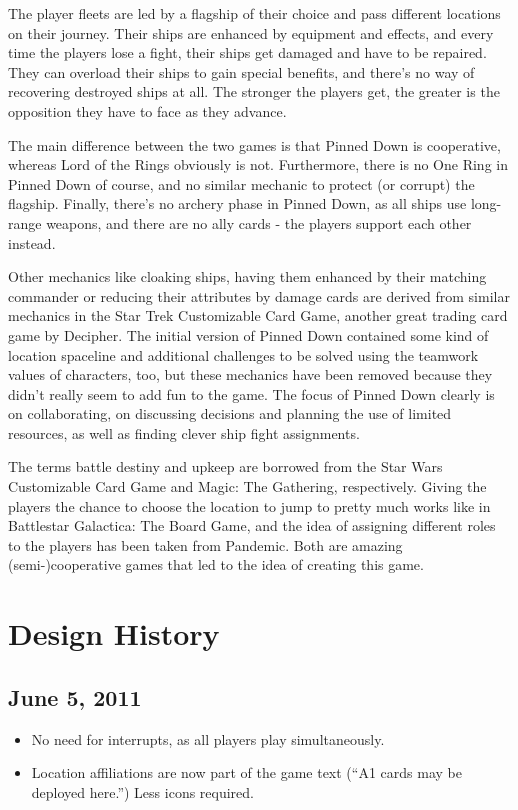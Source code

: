 \documentclass[11pt, a4paper]{article}
\begin{document}
The player fleets are led by a flagship of their choice and pass different
locations on their journey. Their ships are enhanced by equipment and effects,
and every time the players lose a fight, their ships get damaged and have to be
repaired. They can overload their ships to gain special benefits, and there's no
way of recovering destroyed ships at all. The stronger the players get, the
greater is the opposition they have to face as they advance.

The main difference between the two games is that Pinned Down is cooperative,
whereas Lord of the Rings obviously is not. Furthermore, there is no One Ring
in Pinned Down of course, and no similar mechanic to protect (or corrupt) the
flagship. Finally, there's no archery phase in Pinned Down, as all ships use
long-range weapons, and there are no ally cards - the players support each
other instead.

Other mechanics like cloaking ships, having them enhanced by their matching
commander or reducing their attributes by damage cards are derived from similar
mechanics in the Star Trek Customizable Card Game, another great trading card
game by Decipher. The initial version of Pinned Down contained some kind of
location spaceline and additional challenges to be solved using the teamwork
values of characters, too, but these mechanics have been removed because they
didn't really seem to add fun to the game. The focus of Pinned Down clearly is
on collaborating, on discussing decisions and planning the use of limited
resources, as well as finding clever ship fight assignments.

The terms battle destiny and upkeep are borrowed from the Star Wars Customizable
Card Game and Magic: The Gathering, respectively. Giving the players the chance
to choose the location to jump to pretty much works like in Battlestar
Galactica: The Board Game, and the idea of assigning different roles to the
players has been taken from Pandemic. Both are amazing (semi-)cooperative games
that led to the idea of creating this game.

\section{Design History}
\subsection{June 5, 2011}

\begin{itemize}
 \item No need for interrupts, as all players play simultaneously.
 \item Location affiliations are now part of the game text
(``A1 cards may be deployed here.'') Less icons required.
\end{itemize}
\end{document}
